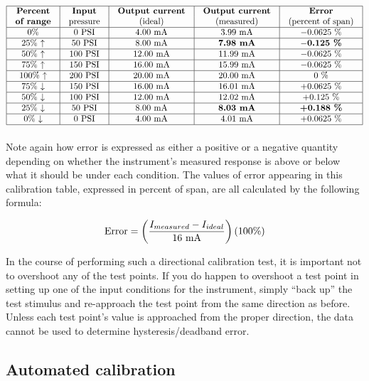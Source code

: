 $$\vbox{\offinterlineskip
\halign{\strut
\vrule \quad\hfil # \ \hfil & 
\vrule \quad\hfil # \ \hfil & 
\vrule \quad\hfil # \ \hfil & 
\vrule \quad\hfil # \ \hfil & 
\vrule \quad\hfil # \ \hfil \vrule \cr
\noalign{\hrule}
%
\textbf{Percent} & \textbf{Input} & \textbf{Output current} & \textbf{Output current} & \textbf{Error} \cr
%
\textbf{of range} & pressure & (ideal) & (measured) & (percent of span) \cr
%
\noalign{\hrule}
%
0\% & 0 PSI & 4.00 mA & 3.99 mA & $-0.0625$ \% \cr
%
\noalign{\hrule}
%
25\% $\uparrow$ & 50 PSI & 8.00 mA & \textbf{7.98 mA} & \textbf{$-$0.125 \%} \cr
%
\noalign{\hrule}
%
50\% $\uparrow$ & 100 PSI & 12.00 mA & 11.99 mA & $-0.0625$ \% \cr
%
\noalign{\hrule}
%
75\% $\uparrow$ & 150 PSI & 16.00 mA & 15.99 mA & $-0.0625$ \% \cr
%
\noalign{\hrule}
%
100\% $\uparrow$ & 200 PSI & 20.00 mA & 20.00 mA & 0 \% \cr
%
\noalign{\hrule}
%
75\% $\downarrow$ & 150 PSI & 16.00 mA & 16.01 mA & +0.0625 \% \cr
%
\noalign{\hrule}
%
50\% $\downarrow$ & 100 PSI & 12.00 mA & 12.02 mA & +0.125 \% \cr
%
\noalign{\hrule}
%
25\% $\downarrow$ & 50 PSI & 8.00 mA & \textbf{8.03 mA} & \textbf{+0.188 \%} \cr
%
\noalign{\hrule}
%
0\% $\downarrow$ & 0 PSI & 4.00 mA & 4.01 mA & +0.0625 \% \cr
%
\noalign{\hrule}
} %
}$$ %

Note again how error is expressed as either a positive or a negative quantity depending on whether the instrument's measured response is above or below what it should be under each condition.  The values of error appearing in this calibration table, expressed in percent of span, are all calculated by the following formula:

$$\hbox{Error} = \left( {{I_{measured} - I_{ideal}} \over 16 \hbox{ mA}} \right)  \left( 100 \% \right)$$

In the course of performing such a directional calibration test, it is important not to overshoot any of the test points.  If you do happen to overshoot a test point in setting up one of the input conditions for the instrument, simply ``back up'' the test stimulus and re-approach the test point from the same direction as before.  Unless each test point's value is approached from the proper direction, the data cannot be used to determine hysteresis/deadband error.







\filbreak
\subsection{Automated calibration}

